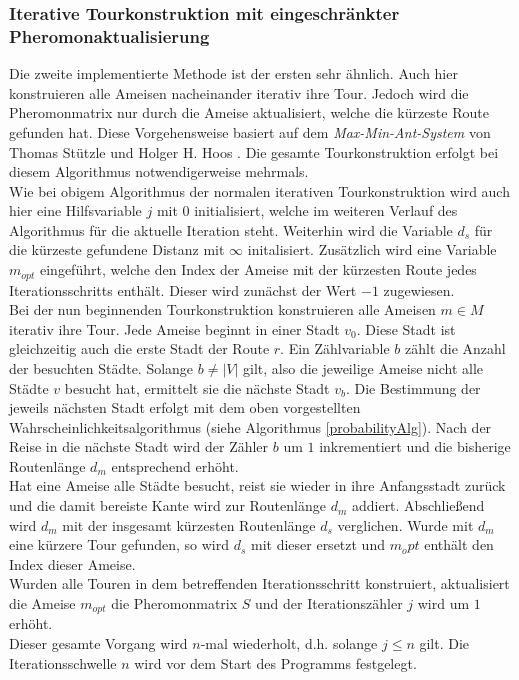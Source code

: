 \documentclass[doktyp=barbeit, sprache=german]{TUBAFarbeiten}
\begin{document}
\subsubsection{Iterative Tourkonstruktion mit eingeschränkter Pheromonaktualisierung}
Die zweite implementierte Methode ist der ersten sehr ähnlich. Auch hier konstruieren alle Ameisen nacheinander iterativ ihre Tour. Jedoch wird die Pheromonmatrix nur durch die Ameise aktualisiert, welche die kürzeste Route gefunden hat. Diese Vorgehensweise basiert auf dem \textit{Max-Min-Ant-System} von Thomas Stützle und Holger H. Hoos \cite{MaxMin}. Die gesamte Tourkonstruktion erfolgt bei diesem Algorithmus notwendigerweise mehrmals. 
\\Wie bei obigem Algorithmus der normalen iterativen Tourkonstruktion wird auch hier eine Hilfsvariable $j$ mit $0$ initialisiert, welche im weiteren Verlauf des Algorithmus für die aktuelle Iteration steht. Weiterhin wird die Variable $d_s$ für die kürzeste gefundene Distanz mit $\infty$ initalisiert. Zusätzlich wird eine Variable $m_{opt}$ eingeführt, welche den Index der Ameise mit der kürzesten Route jedes Iterationsschritts enthält. Dieser wird zunächst der Wert $-1$ zugewiesen.
\\Bei der nun beginnenden Tourkonstruktion konstruieren alle Ameisen $m \in M$ iterativ ihre Tour. Jede Ameise beginnt in einer Stadt $v_0$. Diese Stadt ist gleichzeitig auch die erste Stadt der Route $r$. Ein Zählvariable $b$ zählt die Anzahl der besuchten Städte. Solange $b \neq |V|$ gilt, also die jeweilige Ameise nicht alle Städte $v$ besucht hat, ermittelt sie die nächste Stadt $v_b$. Die Bestimmung der jeweils nächsten Stadt erfolgt mit dem oben vorgestellten Wahrscheinlichkeitsalgorithmus (siehe Algorithmus \ref{probabilityAlg}). Nach der Reise in die nächste Stadt wird der Zähler $b$ um $1$ inkrementiert und die bisherige Routenlänge $d_m$ entsprechend erhöht.
\\Hat eine Ameise alle Städte besucht, reist sie wieder in ihre Anfangsstadt zurück und die damit bereiste Kante wird zur Routenlänge $d_m$ addiert. Abschließend wird $d_m$ mit der insgesamt kürzesten Routenlänge $d_s$ verglichen. Wurde mit $d_m$ eine kürzere Tour gefunden, so wird $d_s$ mit dieser ersetzt und $m_opt$ enthält den Index dieser Ameise. 
\\Wurden alle Touren in dem betreffenden Iterationsschritt konstruiert, aktualisiert die Ameise $m_{opt}$ die Pheromonmatrix $S$ und der Iterationszähler $j$ wird um $1$ erhöht. 
\\Dieser gesamte Vorgang wird $n$-mal wiederholt, d.h. solange $j \leq n$ gilt. Die Iterationsschwelle $n$ wird vor dem Start des Programms festgelegt. 
\end{document}
